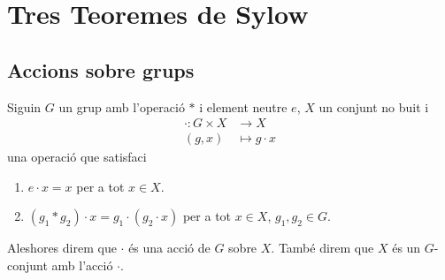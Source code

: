 \documentclass[../../Main.tex]{subfiles}
\begin{document}
\section{Tres Teoremes de Sylow}
	\subsection{Accions sobre grups}
	\begin{definition}
		\label{def:acció d'un grup sobre un conjunt}
		Siguin \(G\) un grup amb l'operació \(\ast\) i element neutre \(e\), \(X\) un conjunt no buit i
		\begin{align*}
		\cdot\colon G\times X&\longrightarrow X\\
		(g,x)&\longmapsto g\cdot x
		\end{align*}
		una operació que satisfaci
		\begin{enumerate}
			\item \(e\cdot x=x\) per a tot \(x\in X\).
			\item \((g_{1}\ast g_{2})\cdot x=g_{1}\cdot(g_{2}\cdot x)\) per a tot \(x\in X\), \(g_{1},g_{2}\in G\).
		\end{enumerate}
		Aleshores direm que \(\cdot\) és una acció de \(G\) sobre \(X\). També direm que \(X\) és un \(G\)-conjunt amb l'acció \(\cdot\).
	\end{definition}
\end{document}
